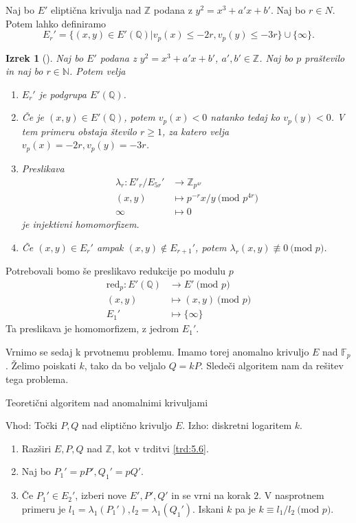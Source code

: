 \documentclass[12pt,a4paper,twoside]{article}
\theoremstyle{definition} %
\theoremstyle{plain} %
\newtheorem{izrek}[definicija]{Izrek}
\numberwithin{equation}{section}  %
\newcommand{\N}{\mathbb N}
\newcommand{\Z}{\mathbb Z}
\newcommand{\Q}{\mathbb Q}
\newcommand{\F}{\mathbb F}
\newcommand{\MOD}[1]{\ \text{(mod }{#1}\text{)}}
\begin{document}
Naj bo $E'$ eliptična krivulja nad $\Z$ podana z $y^2 = x^3+a'x+b'$. Naj bo $r \in N$. Potem lahko definiramo
$$E_r' = \{  (x,y) \in E'(\Q) | v_p(x) \leq -2r, v_p(y) \leq -3r \} \cup \{ \infty \}.$$

\begin{izrek}[]
Naj bo $E'$ podana z $y^2 = x^3+a'x+b'$, $a',b' \in \Z$. Naj bo $p$ praštevilo in naj bo $r \in \N$. Potem velja
\begin{enumerate}

\item $E_r'$ je podgrupa $E'(\Q)$.
\item Če je $(x,y) \in E'(\Q)$, potem $v_p(x)<0$ natanko tedaj ko $v_p(y) <0$. V tem primeru obstaja število $r \geq 1$, za katero velja $v_p(x) = -2r, v_p(y) = -3r$.
\item Preslikava
\begin{align}
\lambda_r: E'_r/E_{5r}' &{}\rightarrow \Z_{p^{4r}} \nonumber \\
(x,y) &{}\mapsto p^{-r}x/y \MOD{p^{4r}} \nonumber \\
\infty &{}\mapsto 0 \nonumber
\end{align}
je injektivni homomorfizem.
\item Če $(x,y) \in E_r'$ ampak $(x,y) \not \in E_{r+1}'$, potem $\lambda_r(x,y) \not \equiv 0 \MOD{p}$.

\end{enumerate}
\end{izrek}

Potrebovali bomo še preslikavo redukcije po modulu $p$
\begin{align}
\text{red}_p: E'(\Q) &{}\rightarrow E' \MOD{p} \nonumber \\
(x,y) &{}\mapsto (x,y) \MOD{p} \nonumber \\
E_1' &{}\mapsto \{ \infty \} \nonumber
\end{align}
Ta preslikava je homomorfizem, z jedrom $E_1'$.

Vrnimo se sedaj k prvotnemu problemu. Imamo torej anomalno krivuljo $E$ nad $\F_p$. Želimo poiskati $k$, tako da bo veljalo $Q = kP$. Sledeči algoritem nam da rešitev tega problema.

\begin{algorithm}[H]
\caption[AN]{Teoretični algoritem nad anomalnimi krivuljami}
\label{alg:Anomal}
Vhod: Točki $P, Q$ nad eliptično krivuljo $E$.\newline
Izho: diskretni logaritem $k$.\newline
\begin{enumerate}
\item Razširi $E,P,Q$ nad $\Z$, kot v trditvi \ref{trd:5.6}.
\item Naj bo $P_1' = pP',Q_1' = pQ'$.
\item Če $P_1' \in E_2'$, izberi nove $E',P',Q'$ in se vrni na korak $2$. V nasprotnem primeru je $l_1 = \lambda_1(P_1'),l_2 = \lambda_1(Q_1')$. Iskani $k$ pa je $k \equiv l_1/l_2 \MOD{p}$.
\end{enumerate}

\end{algorithm}
\end{document}
